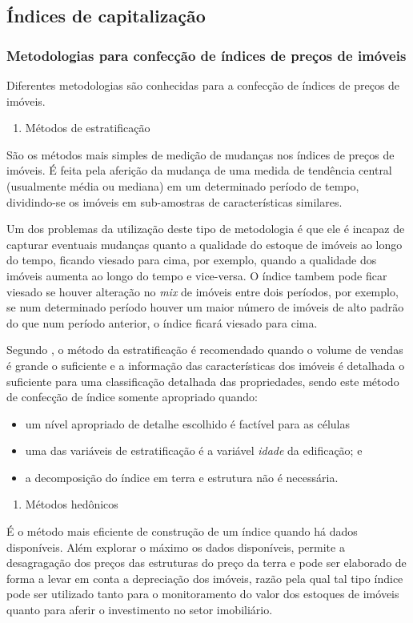 \documentclass[
	12pt,				%
	oneside,			%
	a4paper,			%
	chapter=TITLE,		%
	section=TITLE,		%
	english,			%
	brazil				%
	]{abntex2}
\begin{document}
\subsection{Índices de
capitalização}\label{uxedndices-de-capitalizauxe7uxe3o}

\subsubsection{Metodologias para confecção de índices de preços de
imóveis}\label{metodologias-para-confecuxe7uxe3o-de-uxedndices-de-preuxe7os-de-imuxf3veis}

Diferentes metodologias são conhecidas para a confecção de índices de
preços de imóveis.
\begin{enumerate}
\def\labelenumi{\alph{enumi}.}
\tightlist
\item
  Métodos de estratificação
\end{enumerate}
São os métodos mais simples de medição de mudanças nos índices de preços
de imóveis. É feita pela aferição da mudança de uma medida de tendência
central (usualmente média ou mediana) em um determinado período de
tempo, dividindo-se os imóveis em sub-amostras de características
similares.

Um dos problemas da utilização deste tipo de metodologia é que ele é
incapaz de capturar eventuais mudanças quanto a qualidade do estoque de
imóveis ao longo do tempo, ficando viesado para cima, por exemplo,
quando a qualidade dos imóveis aumenta ao longo do tempo e vice-versa. O
índice tambem pode ficar viesado se houver alteração no \emph{mix} de
imóveis entre dois períodos, por exemplo, se num determinado período
houver um maior número de imóveis de alto padrão do que num período
anterior, o índice ficará viesado para cima.

Segundo \textcites{rppi}[158]{rppi}, o método da estratificação é
recomendado quando o volume de vendas é grande o suficiente e a
informação das características dos imóveis é detalhada o suficiente para
uma classificação detalhada das propriedades, sendo este método de
confecção de índice somente apropriado quando:
\begin{itemize}
\tightlist
\item
  um nível apropriado de detalhe escolhido é factível para as células
\item
  uma das variáveis de estratificação é a variável \emph{idade} da
  edificação; e
\item
  a decomposição do índice em terra e estrutura não é necessária.
\end{itemize}
\begin{enumerate}
\def\labelenumi{\alph{enumi}.}
\setcounter{enumi}{1}
\tightlist
\item
  Métodos hedônicos
\end{enumerate}
É o método mais eficiente de construção de um índice quando há dados
disponíveis. Além explorar o máximo os dados disponíveis, permite a
desagragação dos preços das estruturas do preço da terra e pode ser
elaborado de forma a levar em conta a depreciação dos imóveis, razão
pela qual tal tipo índice pode ser utilizado tanto para o monitoramento
do valor dos estoques de imóveis quanto para aferir o investimento no
setor imobiliário.
\end{document}
